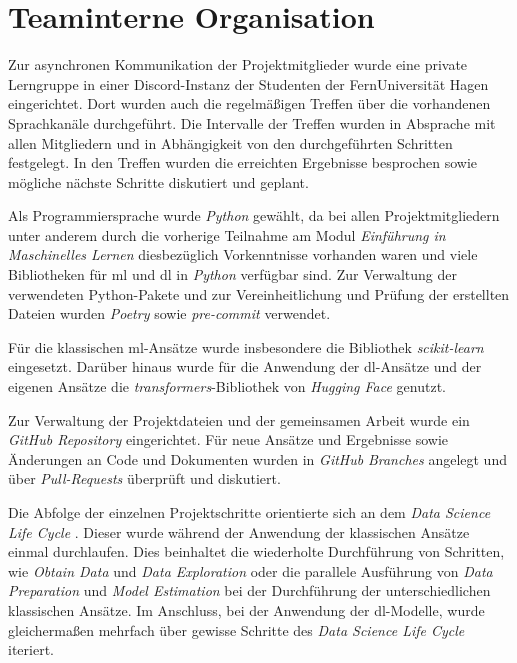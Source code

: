 \section{Teaminterne Organisation}\label{sec:teaminterneorganisation}

Zur asynchronen Kommunikation der Projektmitglieder wurde eine private Lerngruppe in einer Discord-Instanz der Studenten der FernUniversität Hagen eingerichtet.
Dort wurden auch die regelmäßigen Treffen über die vorhandenen Sprachkanäle durchgeführt.
Die Intervalle der Treffen wurden in Absprache mit allen Mitgliedern und in Abhängigkeit von den durchgeführten Schritten festgelegt.
In den Treffen wurden die erreichten Ergebnisse besprochen sowie mögliche nächste Schritte diskutiert und geplant.

Als Programmiersprache wurde \textit{Python} gewählt, da bei allen Projektmitgliedern unter anderem durch die vorherige Teilnahme am Modul \textit{Einführung in Maschinelles Lernen} diesbezüglich Vorkenntnisse vorhanden waren und viele Bibliotheken für \gls{ml} und \gls{dl} in \textit{Python} verfügbar sind.
Zur Verwaltung der verwendeten Python-Pakete und zur Vereinheitlichung und Prüfung der erstellten Dateien wurden \textit{Poetry} \cite{poetry2025} sowie \textit{pre-commit} \cite{precommit2025} verwendet.

Für die klassischen \gls{ml}-Ansätze wurde insbesondere die Bibliothek \textit{scikit-learn} eingesetzt.
Darüber hinaus wurde für die Anwendung der \gls{dl}-Ansätze und der eigenen Ansätze die \textit{transformers}-Bibliothek von \textit{Hugging Face} genutzt.

Zur Verwaltung der Projektdateien und der gemeinsamen Arbeit wurde ein \textit{GitHub Repository} \cite{githubrepo2025} eingerichtet.
Für neue Ansätze und Ergebnisse sowie Änderungen an Code und Dokumenten wurden in \textit{GitHub} \textit{Branches} angelegt und über \textit{Pull-Requests} überprüft und diskutiert.

Die Abfolge der einzelnen Projektschritte orientierte sich an dem \textit{Data Science Life Cycle} \cite[Abb. 2]{Stodden2020}.
Dieser wurde während der Anwendung der klassischen Ansätze einmal durchlaufen.
Dies beinhaltet die wiederholte Durchführung von Schritten, wie \textit{Obtain Data} und \textit{Data Exploration} oder die parallele Ausführung von \textit{Data Preparation} und \textit{Model Estimation} bei der Durchführung der unterschiedlichen klassischen Ansätze.
Im Anschluss, bei der Anwendung der \gls{dl}-Modelle, wurde gleichermaßen mehrfach über gewisse Schritte des \textit{Data Science Life Cycle} iteriert.
